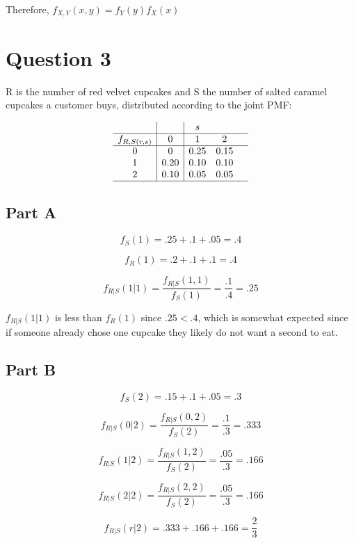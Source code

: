 \documentclass[letterpaper]{article}
\begin{document}
\begin{center} Therefore, $f_{X, Y} (x, y) =  f_Y(y)f_X(x)$ \end{center}

\newpage

\section*{Question 3}

R is the number of red velvet cupcakes and S the number of salted caramel cupcakes a customer buys, distributed according to the joint PMF:

$$\begin{array}{c|c|ccc}{} & {} & {s} & {} & {} \\ \hline f_{R, S(r, s)} & {0} & {1} & {2} \\ \hline 0 & {0} & {0.25} & {0.15} \\ {1} & {0.20} & {0.10} & {0.10} \\ {2} & {0.10} & {0.05} & {0.05} \\ \hline\end{array}$$

\subsection*{Part A}

$$f_S (1) = .25 + .1 + .05 = .4$$

$$f_R (1) = .2 + .1 + .1 = .4$$

$$f_{R|S} (1|1) = \frac{f_{R|S} (1, 1)}{f_S (1)} = \frac{.1}{.4} = .25$$

$f_{R|S} (1|1)$ is less than $f_{R} (1)$ since $.25 < .4$, which is somewhat expected since if someone already chose one cupcake they likely do not want a second to eat.

\subsection*{Part B}

$$f_{S} (2) = .15 + .1 + .05 = .3$$

$$f_{R|S} (0|2) = \frac{f_{R|S} (0, 2)}{f_{S} (2)} = \frac{.1}{.3} = .333$$

$$f_{R|S} (1|2) = \frac{f_{R|S} (1, 2)}{f_{S} (2)} = \frac{.05}{.3} = .166$$

$$f_{R|S} (2|2) = \frac{f_{R|S} (2, 2)}{f_{S} (2)} = \frac{.05}{.3} = .166$$

$$f_{R|S} (r|2) = .333 + .166 + .166 = \frac{2}{3}$$
\end{document}
